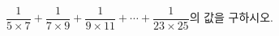 $\dfrac{1}{5\times 7}+\dfrac{1}{7\times 9}+\dfrac{1}{9\times 11}+\cdots+\dfrac{1}{23\times 25}$의 값을 구하시오.
